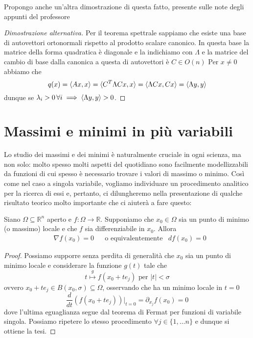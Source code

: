 Propongo anche un'altra dimostrazione di questa fatto, presente sulle note degli appunti del professore
\begin{proof}[Dimostrazione alternativa]
Per il teorema spettrale sappiamo che esiste una base di autovettori ortonormali rispetto al prodotto scalare canonico. In questa base la matrice della forma quadratica è diagonale e la indichiamo con $\Lambda$ e la matrice del cambio di base dalla canonica a questa di autovettori è $C \in O(n)$ Per $x \neq 0$ abbiamo che
$$
q(x) = \langle Ax, x \rangle = \langle C^T \Lambda C x, x \rangle = \langle \Lambda Cx, Cx \rangle = \langle \Lambda y, y \rangle
$$
dunque se $\lambda_i > 0 \, \forall i \implies \langle \Lambda y, y \rangle > 0$.
\end{proof}
\section{Massimi e minimi in più variabili}
Lo studio dei massimi e dei minimi è naturalmente cruciale in ogni scienza, ma non solo: molto spesso molti aspetti del quotidiano sono facilmente modellizzabili da funzioni di cui spesso è necessario trovare i valori di massimo o minimo. Così come nel caso a singola variabile, vogliamo individuare un procedimento analitico per la ricerca di essi e, pertanto, ci dilungheremo nella presentazione di qualche risultato teorico molto importante che ci aiuterà a fare questo:
\begin{theorem}
Siano $\Omega \subseteq \mathbb{R}^n$ aperto e $f: \Omega \to \mathbb{R}$. Supponiamo che $x_0 \in \Omega$ sia un punto di minimo (o massimo) locale e che $f$ sia differenziabile in $x_0$. Allora
\begin{align*}
&\nabla{f(x_0)} = 0 & &\text{o equivalentemente} &df(x_0) = 0 
\end{align*}
\end{theorem}
\begin{proof}
Possiamo supporre senza perdita di generalità che $x_0$ sia un punto di minimo locale e considerare la funzione $g(t)$ tale che
$$
t \stackrel{g}{\mapsto} f(x_0 + te_j) \text{ per } |t| < \sigma
$$
ovvero $x_0 + te_j \in B(x_0, \sigma) \subseteq \Omega$, osservando che ha un minimo locale in $t=0$
$$
\frac{d}{dt} \left( f(x_0 + te_j) \right){\big|_{t=0}} = \partial_{x_j} f(x_0) = 0
$$
dove l'ultima eguaglianza segue dal teorema di Fermat per funzioni di variabile singola. Possiamo ripetere lo stesso procedimento $\forall j \in \{1, \ldots n \}$ e dunque si ottiene la tesi.
\end{proof}
